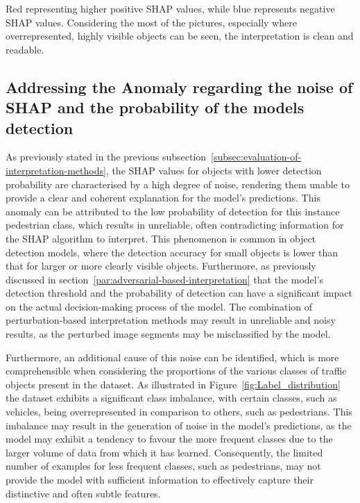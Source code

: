 Red representing higher positive SHAP values, while blue represents negative SHAP values.
Considering the most of the pictures, especially where overrepresented, highly visible objects can be seen, the interpretation is clean and readable.


\subsection{Addressing the Anomaly regarding the noise of SHAP and the probability of the models detection}\label{subsec:Addressing the Anomaly regarding SHAP and the probability of detection}

As previously stated in the previous subsection~\ref{subsec:evaluation-of-interpretation-methods},
the SHAP values for objects with lower detection probability are characterised by a high degree of noise,
rendering them unable to provide a clear and coherent explanation for the model's predictions.
This anomaly can be attributed to the low probability of detection for this instance pedestrian class, which results in unreliable,
often contradicting information for the SHAP algorithm to interpret.
This phenomenon is common in object detection models, where the detection accuracy for small objects is lower than that for larger or more clearly visible objects.
Furthermore, as previously discussed in section~\ref{par:adversarial-based-interpretation} that the model's detection threshold and the probability of detection can
have a significant impact on the actual decision-making process of the model.
The combination of perturbation-based interpretation methods may result in unreliable and noisy results, as the perturbed image segments may be misclassified by the model.

Furthermore, an additional cause of this noise can be identified, which is more comprehensible when considering the proportions of the various classes of traffic objects present in the dataset.
As illustrated in Figure~\ref{fig:Label_distribution} the dataset exhibits a significant class imbalance, with certain classes, such as vehicles, being overrepresented in comparison to others, such as pedestrians.
This imbalance may result in the generation of noise in the model's predictions, as the model may exhibit a tendency to favour the more frequent classes due to the larger volume of data from which it has learned.
Consequently, the limited number of examples for less frequent classes, such as pedestrians, may not provide the model with sufficient information to effectively capture their distinctive and often subtle features.

